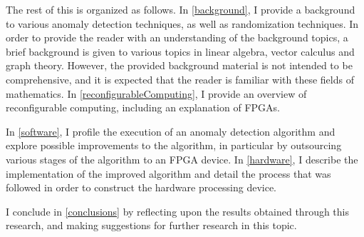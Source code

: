 The rest of this \thesis{} is organized as follows. In \autoref{background}, I
provide a background to various anomaly detection techniques, as well as
randomization techniques. In order to provide the reader with an understanding
of the background topics, a brief background is given to various topics in
linear algebra, vector calculus and graph theory. However, the provided
background material is not intended to be comprehensive, and it is expected that
the reader is familiar with these fields of mathematics. In
\autoref{reconfigurableComputing}, I provide an overview of reconfigurable
computing, including an explanation of \glspl{FPGA}.

In \autoref{software}, I profile the execution of an anomaly detection algorithm
and explore possible improvements to the algorithm, in particular by outsourcing
various stages of the algorithm to an FPGA device. In \autoref{hardware},
I describe the implementation of the improved algorithm and detail the process
that was followed in order to construct the hardware processing device.
\begin{comment}
In \autoref{results}, I record results obtained by benchmarking the device that
was previously designed and constructed, and comparing the expected improvements
to the algorithm's execution with the measured results.
\end{comment}

I conclude in \autoref{conclusions} by reflecting upon the results obtained
through this research, and making suggestions for further research in this
topic.